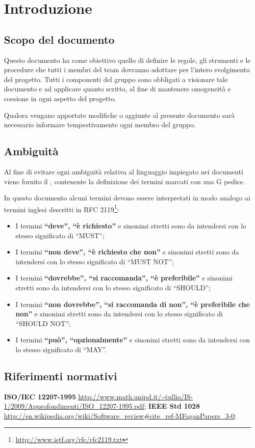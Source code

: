 \section{Introduzione}

\subsection{Scopo del documento}

Questo documento ha come obiettivo quello di definire le regole, gli strumenti e le procedure che tutti i membri del team dovranno adottare per l'intero svolgimento del progetto. Tutti i componenti del gruppo sono obbligati a visionare tale documento e ad applicare quanto scritto, al fine di mantenere omogeneità e coesione in ogni aspetto del progetto.

Qualora vengano apportate modifiche o aggiunte al presente documento sarà necessario informare tempestivamente ogni membro del gruppo.

\subsection{Ambiguità}

Al fine di evitare ogni ambiguità relativa al linguaggio impiegato nei documenti viene fornito il \Glossario{}, contenente la definizione dei termini marcati con una G pedice.

In questo documento alcuni termini devono essere interpretati in modo analogo ai termini inglesi descritti in RFC 2119\footnote{\url{http://www.ietf.org/rfc/rfc2119.txt}}:
\begin{itemize}
 \item I termini \textbf{``deve'', ``è richiesto''} e sinonimi stretti sono da intendersi con lo stesso significato di ``MUST'';
 \item I termini \textbf{``non deve'', ``è richiesto che non''} e sinonimi stretti sono da intendersi con lo stesso significato di ``MUST NOT'';
 \item I termini \textbf{``dovrebbe'', ``si raccomanda'', ``è preferibile''} e sinonimi stretti sono da intendersi con lo stesso significato di ``SHOULD'';
 \item I termini \textbf{``non dovrebbe'', ``si raccomanda di non'', ``è preferibile che non''} e sinonimi stretti sono da intendersi con lo stesso significato di ``SHOULD NOT'';
 \item I termini \textbf{``può'', ``opzionalmente''} e sinonimi stretti sono da intendersi con lo stesso significato di ``MAY''.
\end{itemize}

\subsection{Riferimenti normativi}
\textbf{ISO/IEC 12207-1995} \url{http://www.math.unipd.it/~tullio/IS-1/2009/Approfondimenti/ISO_12207-1995.pdf};
\textbf{IEEE Std 1028} \url{http://en.wikipedia.org/wiki/Software_review#cite_ref-MFaganPapers_3-0};